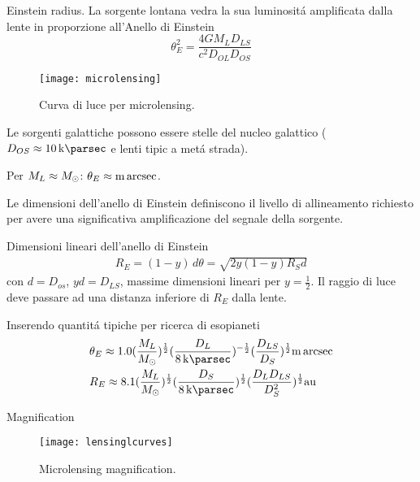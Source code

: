 \begin{frame}{Einstein radius.}
La sorgente lontana vedra la sua luminosit\'a amplificata dalla lente in proporzione all'Anello di Einstein
\begin{equation*}
    \theta_E^2=\frac{4GM_LD_{LS}}{c^2D_{OL}D_{OS}}
\end{equation*}
\begin{figure}[!ht]
\centering
\texttt{[image: microlensing]}
\caption{Curva di luce per microlensing.}
\end{figure}
Le sorgenti galattiche possono essere stelle del nucleo galattico ($D_{OS}\approx\SI{10}{\kilo\parsec}$ e lenti tipic a met\'a strada).

Per $M_L\approx\msun{}$: $\theta_E\approx\si{\milli\arcsec}$.

Le dimensioni dell'anello di Einstein definiscono il livello di allineamento richiesto per avere una significativa amplificazione del segnale della sorgente.

Dimensioni lineari dell'anello di Einstein
\begin{align*}
    R_E=(1-y)\,d\theta=\sqrt{2y(1-y)R_Sd}
\end{align*}
con $d=D_{os}$, $yd=D_{LS}$, massime dimensioni lineari per $y=\frac{1}{2}$.
Il raggio di luce deve passare ad una distanza inferiore di $R_E$ dalla lente.

Inserendo quantit\'a tipiche per ricerca di esopianeti
\begin{align*}
&\theta_E\approx1.0(\frac{M_L}{\msun{}})\expy{\frac{1}{2}}(\frac{D_L}{\SI{8}{\kilo\parsec}})\expy{-\frac{1}{2}}(\frac{D_{LS}}{D_S})\expy{\frac{1}{2}}\si{\milli\arcsec}\\
&R_E\approx8.1(\frac{M_L}{\msun{}})\expy{\frac{1}{2}}(\frac{D_S}{\SI{8}{\kilo\parsec}})\expy{\frac{1}{2}}(\frac{D_LD_{LS}}{D_S^2})\expy{\frac{1}{2}}\si{\astronomicalunit}
\end{align*}
\end{frame}

\begin{frame}{Magnification}
\begin{figure}[!ht]
\centering
\texttt{[image: lensinglcurves]}
\caption{Microlensing magnification.}
\end{figure}
\end{frame}

